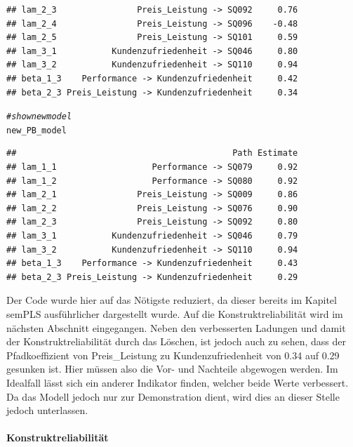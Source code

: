 \documentclass{article}\usepackage[]{graphicx}\usepackage[]{color}
\makeatletter
\newcommand{\hlcom}[1]{\textcolor[rgb]{0.678,0.584,0.686}{\textit{#1}}}%
\newcommand{\hlstd}[1]{\textcolor[rgb]{0.345,0.345,0.345}{#1}}%
\newenvironment{kframe}{%
 \def\at@end@of@kframe{}%
 \ifinner\ifhmode%
  \def\at@end@of@kframe{\end{minipage}}%
  \begin{minipage}{\columnwidth}%
 \fi\fi%
 \def\FrameCommand##1{\hskip\@totalleftmargin \hskip-\fboxsep
 \colorbox{shadecolor}{##1}\hskip-\fboxsep
     \hskip-\linewidth \hskip-\@totalleftmargin \hskip\columnwidth}%
 \MakeFramed {\advance\hsize-\width
   \@totalleftmargin\z@ \linewidth\hsize
   \@setminipage}}%
 {\par\unskip\endMakeFramed%
 \at@end@of@kframe}
\newenvironment{knitrout}{}{} %
\makeatother
\begin{document}
\begin{knitrout}
\begin{kframe}
\begin{verbatim}
## lam_2_3                Preis_Leistung -> SQ092     0.76
## lam_2_4                Preis_Leistung -> SQ096    -0.48
## lam_2_5                Preis_Leistung -> SQ101     0.59
## lam_3_1           Kundenzufriedenheit -> SQ046     0.80
## lam_3_2           Kundenzufriedenheit -> SQ110     0.94
## beta_1_3    Performance -> Kundenzufriedenheit     0.42
## beta_2_3 Preis_Leistung -> Kundenzufriedenheit     0.34
\end{verbatim}
\begin{alltt}
\hlcom{#show new model}
\hlstd{new_PB_model}
\end{alltt}
\begin{verbatim}
##                                           Path Estimate
## lam_1_1                   Performance -> SQ079     0.92
## lam_1_2                   Performance -> SQ080     0.92
## lam_2_1                Preis_Leistung -> SQ009     0.86
## lam_2_2                Preis_Leistung -> SQ076     0.90
## lam_2_3                Preis_Leistung -> SQ092     0.80
## lam_3_1           Kundenzufriedenheit -> SQ046     0.79
## lam_3_2           Kundenzufriedenheit -> SQ110     0.94
## beta_1_3    Performance -> Kundenzufriedenheit     0.43
## beta_2_3 Preis_Leistung -> Kundenzufriedenheit     0.29
\end{verbatim}
\end{kframe}
\end{knitrout}
Der Code wurde hier auf das Nötigste reduziert, da dieser bereits im Kapitel semPLS ausführlicher dargestellt wurde. Auf die Konstruktreliabilität wird im nächsten Abschnitt eingegangen. Neben den verbesserten Ladungen und damit der Konstruktreliabilität durch das Löschen, ist jedoch auch zu sehen, dass der Pfadkoeffizient von Preis\_Leistung zu Kundenzufriedenheit von 0.34 auf 0.29 gesunken ist. Hier müssen also die Vor- und Nachteile abgewogen werden. Im Idealfall lässt sich ein anderer Indikator finden, welcher beide Werte verbessert. Da das Modell jedoch nur zur Demonstration dient, wird dies an dieser Stelle jedoch unterlassen.

\paragraph{Konstruktreliabilität} 
\end{document}
